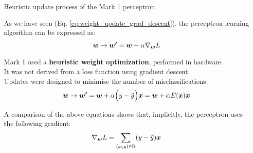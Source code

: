\begin{frame}[t]{Heuristic update process of the Mark 1 perceptron}

    As we have seen (Eq. \ref{eq:weight_update_grad_descent}), 
    the \gls{perceptron} 
    learning algorithm can be expressed as:
    \begin{equation*}
        \boldsymbol{w} \rightarrow \boldsymbol{w^\prime} = \boldsymbol{w} - \alpha \nabla_{\boldsymbol{w}} L
    \end{equation*}

    Mark 1 used a {\bf heuristic weight optimization}, performed in hardware.\\
    It was not derived from a \gls{loss function} 
    using \gls{gradient descent}.\\
    \vspace{0.2cm} 
    Updates were designed to minimise the number of misclassifications:\\
    \begin{equation}
        \boldsymbol{w} \rightarrow \boldsymbol{w^\prime} = 
        \boldsymbol{w} + \alpha \Big(y - \hat{y}\Big) \boldsymbol{x} =
        \boldsymbol{w} + \alpha E(\boldsymbol{x}) \boldsymbol{x} 
        \label{eq:percepton_weight_update_1}
    \end{equation}

    A comparison of the above equations shows that, 
    implicitly, the \gls{perceptron} 
    uses the following gradient: 
    \begin{equation}
        \nabla_{\boldsymbol{w}} L = 
          \sum_{(\boldsymbol{x},y) \in \mathbb{D}} 
          (y - \hat{y}) \boldsymbol{x}
    \label{eq:percepton_smooth_gradient_1}  
    \end{equation}



\end{frame}



%
%
%

